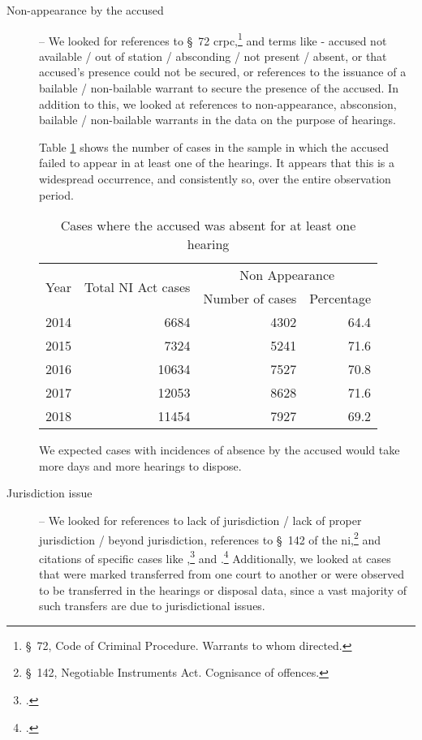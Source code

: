 \begin{description}
\item [Non-appearance by the accused] -- We looked for references to \S~72 \gls{crpc},\footnote{\S~72, Code of Criminal Procedure. Warrants to whom directed.} and terms like - accused not available / out of station / absconding / not present / absent, or that accused’s presence could not be secured, or references to the issuance of a bailable / non-bailable warrant to secure the presence of the accused. In addition to this, we looked at references to non-appearance, absconsion, bailable / non-bailable warrants in the data on the purpose of hearings.

Table \ref{tab:nonAppearance_yearWise} shows the number of cases in the sample in which the accused failed to appear in at least one of the hearings. It appears that this is a widespread occurrence, and consistently so, over the entire observation period.

\begin{longtable}{@{}lrrr@{}}
 \caption{Cases where the accused was absent for at least one hearing}\label{tab:nonAppearance_yearWise}\\
\toprule
\multirow{2}{*}{Year} & \multirow{2}{*}{Total NI Act cases} & \multicolumn{2}{c}{Non Appearance}\\
\cmidrule{3-4}
&& Number of cases & Percentage \\
\midrule\endhead
2014 & 6684 & 4302 & 64.4 \\
2015 & 7324 & 5241 & 71.6 \\
2016 & 10634 & 7527 & 70.8 \\
2017 & 12053 & 8628 & 71.6 \\
2018 & 11454 & 7927 & 69.2 \\
\bottomrule
\end{longtable}

We expected cases with incidences of absence by the accused would take more days and more hearings to dispose. 

\item[]

\item [Jurisdiction issue] -- We looked for references to lack of jurisdiction / lack of proper jurisdiction / beyond jurisdiction, references to \S~142 of the \gls{ni},\footnote{\S~142, Negotiable Instruments Act. Cognisance of offences.} and citations of specific cases like ,\footcite{sc2014_dhanuka} and .\footcite{sc2016_carbon} Additionally, we looked at cases that were marked transferred from one court to another or were observed to be transferred in the hearings or disposal data, since a vast majority of such transfers are due to jurisdictional issues.


\end{description}
